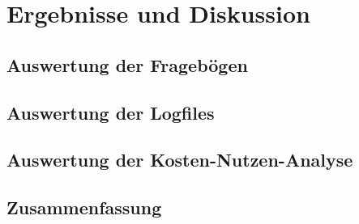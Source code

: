 \section{Ergebnisse und Diskussion}
\subsection{Auswertung der Fragebögen}
\subsection{Auswertung der Logfiles}
\subsection{Auswertung der Kosten-Nutzen-Analyse}
\subsection{Zusammenfassung}